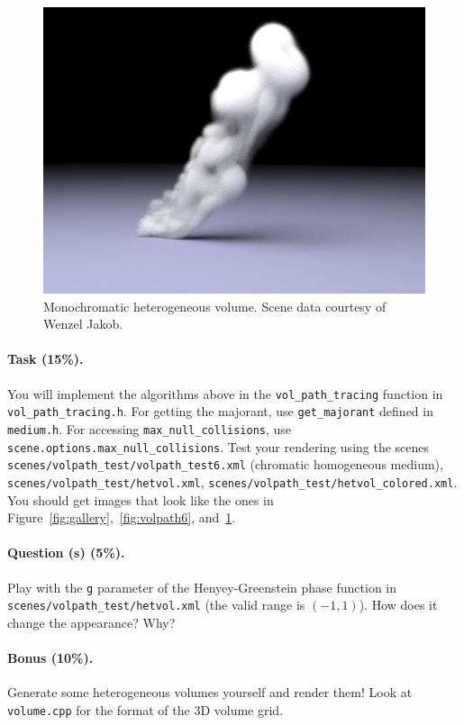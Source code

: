 \begin{figure}
\centering
\includegraphics[width=0.48\linewidth]{imgs/hetvol.png}
\caption{Monochromatic heterogeneous volume. Scene data courtesy of Wenzel Jakob.}
\label{fig:hetvol}
\end{figure}

\paragraph{Task (15\%).} You will implement the algorithms above in the \lstinline{vol_path_tracing} function in \lstinline{vol_path_tracing.h}. For getting the majorant, use \lstinline{get_majorant} defined in \lstinline{medium.h}. For accessing \lstinline{max_null_collisions}, use \lstinline{scene.options.max_null_collisions}. Test your rendering using the scenes \lstinline{scenes/volpath_test/volpath_test6.xml} (chromatic homogeneous medium), \lstinline{scenes/volpath_test/hetvol.xml},  \lstinline{scenes/volpath_test/hetvol_colored.xml}. You should get images that look like the ones in Figure~\ref{fig:gallery},~\ref{fig:volpath6}, and~\ref{fig:hetvol}.

\paragraph{Question (s) (5\%).} Play with the \lstinline{g} parameter of the Henyey-Greenstein phase function in \lstinline{scenes/volpath_test/hetvol.xml} (the valid range is $(-1, 1)$). How does it change the appearance? Why? 

\paragraph{Bonus (10\%).} Generate some heterogeneous volumes yourself and render them! Look at \lstinline{volume.cpp} for the format of the 3D volume grid.




